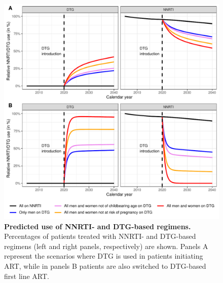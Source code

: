 \documentclass[10pt,letterpaper]{article}
\providecommand{\DIFdelbegin}{} %
\providecommand{\DIFaddbeginFL}{} %
\providecommand{\DIFaddendFL}{} %
\providecommand{\DIFdelendFL}{} %
\newcommand{\DIFscaledelfig}{0.5}
\newlength{\DIFdelgraphicswidth} %
\newlength{\DIFdelgraphicsheight} %
\newcommand{\DIFaddincludegraphics}[2][]{{\color{blue}\fbox{\DIFOincludegraphics[#1]{#2}}}} %
\newcommand{\DIFdelincludegraphics}[2][]{%
\sbox{\DIFdelgraphicsbox}{\DIFOincludegraphics[#1]{#2}}%
\settoboxwidth{\DIFdelgraphicswidth}{\DIFdelgraphicsbox} %
\settoboxtotalheight{\DIFdelgraphicsheight}{\DIFdelgraphicsbox} %
\scalebox{\DIFscaledelfig}{%
\parbox[b]{\DIFdelgraphicswidth}{\usebox{\DIFdelgraphicsbox}\\[-\baselineskip] \rule{\DIFdelgraphicswidth}{0em}}\llap{\resizebox{\DIFdelgraphicswidth}{\DIFdelgraphicsheight}{%
\setlength{\unitlength}{\DIFdelgraphicswidth}%
\begin{picture}(1,1)%
\thicklines\linethickness{2pt} %
{\color[rgb]{1,0,0}\put(0,0){\framebox(1,1){}}}%
{\color[rgb]{1,0,0}\put(0,0){\line( 1,1){1}}}%
{\color[rgb]{1,0,0}\put(0,1){\line(1,-1){1}}}%
\end{picture}%
}\hspace*{3pt}}} %
} %
\DeclareRobustCommand{\DIFdelbegin}{\DIFOdelbegin \let\includegraphics\DIFdelincludegraphics} %
\DeclareRobustCommand{\DIFaddbeginFL}{\DIFOaddbeginFL \let\includegraphics\DIFaddincludegraphics} %
\DeclareRobustCommand{\DIFaddendFL}{\DIFOaddendFL \let\includegraphics\DIFOincludegraphics} %
\DeclareRobustCommand{\DIFdelendFL}{\DIFOaddendFL \let\includegraphics\DIFOincludegraphics} %
\begin{document}
\DIFdelbegin %
   \DIFdelendFL \DIFaddbeginFL \begin{figure}[h!]
   \includegraphics[width=14cm]{../figures/Fig2.pdf}
   \DIFaddendFL \vspace{0.5cm}
   \caption{{\bf Predicted use of NNRTI- and DTG-based regimens.}
Percentages of patients treated with NNRTI- and DTG-based regimens (left and right panels, respectively) are shown. Panels A represent the scenarios where DTG is used in patients initiating ART, while in panels B patients are also switched to DTG-based first line ART.}\label{fig2}
\end{figure}
\end{document}
